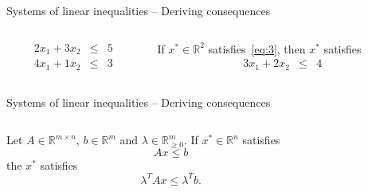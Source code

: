 \begin{frame}{Systems of linear inequalities -- Deriving consequences}

    \begin{columns}
      \begin{column}{.5\textwidth}

        \begin{equation}\label{eq:3}
          \begin{array}{lcr}
            2 x_1 + 3 x_2 & ≤ & 5 \\
            4 x_1 + 1 x_2 & ≤& 3
          \end{array}
        \end{equation}
               
      \end{column}
      \begin{column}{.5\textwidth}
        If $x^* ∈ ℝ^2$ satisfies~\eqref{eq:3}, then $x^*$ satisfies
        \begin{displaymath}          
          \begin{array}{lcr}
            3 x_1 + 2 x_2 & ≤ & 4          
          \end{array}
        \end{displaymath}
      \end{column}       
    \end{columns}
  \end{frame}  

  \begin{frame}{Systems of linear inequalities -- Deriving consequences}

    \begin{columns}
      \begin{column}{.5\textwidth}
        Let $A ∈ ℝ^{m ×n}$, $b ∈ ℝ^m$ and $λ ∈ ℝ_{≥0}^m$. If
        $x^* ∈ ℝ^n$ satisfies
        \begin{displaymath}
          A x≤ b 
        \end{displaymath}
        the $x^*$ satisfies
        \begin{displaymath}
          λ^T A x ≤ λ^Tb.
        \end{displaymath}
      \end{column}
      \begin{column}{.5\textwidth}
      \end{column}       
    \end{columns}
  \end{frame}  


